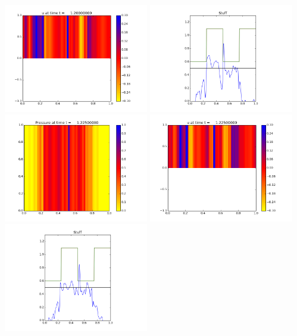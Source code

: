 \documentclass[11pt]{article}
\begin{document}
\includegraphics[width=0.475\textwidth]{frame0048fig1.png}
\vskip 10pt 
\includegraphics[width=0.475\textwidth]{frame0048fig3.png}
\vskip 10pt 
\includegraphics[width=0.475\textwidth]{frame0049fig0.png}
\includegraphics[width=0.475\textwidth]{frame0049fig1.png}
\vskip 10pt 
\includegraphics[width=0.475\textwidth]{frame0049fig3.png}
\end{document}
